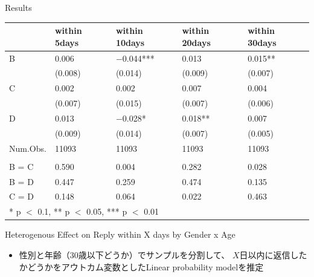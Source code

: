 \documentclass[
      aspectratio=169,
        12pt,
    ]{beamer}
\providecommand{\tightlist}{%
  \setlength{\itemsep}{0pt}\setlength{\parskip}{0pt}}
\begin{document}
\begin{frame}{Results}
\protect\hypertarget{results}{}
\begin{table}
\centering
\fontsize{9}{11}\selectfont
\begin{tabular}[t]{l>{\centering\arraybackslash}p{6em}>{\centering\arraybackslash}p{6em}>{\centering\arraybackslash}p{6em}>{\centering\arraybackslash}p{6em}}
\toprule
  & within 5days & within 10days & within 20days & within 30days\\
\midrule
B & \num{0.006} & \num{-0.044}*** & \num{0.013} & \num{0.015}**\\
 & (\num{0.008}) & (\num{0.014}) & (\num{0.009}) & (\num{0.007})\\
C & \num{0.002} & \num{0.002} & \num{0.007} & \num{0.004}\\
 & (\num{0.007}) & (\num{0.015}) & (\num{0.007}) & (\num{0.006})\\
D & \num{0.013} & \num{-0.028}* & \num{0.018}** & \num{0.007}\\
 & (\num{0.009}) & (\num{0.014}) & (\num{0.007}) & (\num{0.005})\\
\midrule
Num.Obs. & \num{11093} & \num{11093} & \num{11093} & \num{11093}\\
\addlinespace[0.3em]
\multicolumn{5}{l}{\textit{F-tests, p-value}}\\
\hspace{1em}B = C & \num{0.590} & \num{0.004} & \num{0.282} & \num{0.028}\\
\hspace{1em}B = D & \num{0.447} & \num{0.259} & \num{0.474} & \num{0.135}\\
\hspace{1em}C = D & \num{0.148} & \num{0.064} & \num{0.022} & \num{0.463}\\
\bottomrule
\multicolumn{5}{l}{\rule{0pt}{1em}* p $<$ 0.1, ** p $<$ 0.05, *** p $<$ 0.01}\\
\end{tabular}
\end{table}
\end{frame}

\begin{frame}{Heterogenous Effect on Reply within X days by Gender x Age}
\protect\hypertarget{heterogenous-effect-on-reply-within-x-days-by-gender-x-age}{}
\begin{itemize}
\tightlist
\item
  性別と年齢（30歳以下どうか）でサンプルを分割して、
  \(X\)日以内に返信したかどうかをアウトカム変数としたLinear probability modelを推定
\end{itemize}
\end{frame}
\end{document}
